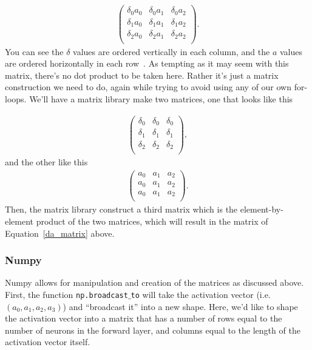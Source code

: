 \documentclass[12pt]{article}
\begin{document}
\begin{align}
 \begin{pmatrix}
           \delta_0 a_0 & \delta_0 a_1  & \delta_0 a_2\\
           \delta_1 a_0 & \delta_1 a_1  & \delta_1 a_2\\
           \delta_2 a_0 & \delta_2 a_1 & \delta_2 a_2\\
         \end{pmatrix}.
         \label{da_matrix}
 \end{align}
You can see the $\delta$ values are ordered vertically in each column, and the $a$ values are ordered horizontally in each row~\cite{karpathy_youtube_01}. As tempting as it may seem with this matrix, there's no dot product to be taken here. Rather it's just a matrix construction we need to do, again while trying to avoid using any of our own for-loops.  We'll have a matrix library make two matrices, one that looks like this
 
 \begin{align}
 \begin{pmatrix}
           \delta_0 & \delta_0 & \delta_0\\
           \delta_1 & \delta_1 & \delta_1\\
           \delta_2 & \delta_2 & \delta_2\\
         \end{pmatrix},
 \end{align}
 and the other like this
 \begin{align}
 \begin{pmatrix}
           a_0 & a_1  & a_2\\
           a_0 & a_1  & a_2\\
           a_0 & a_1 & a_2\\
         \end{pmatrix}.
         \label{act_matrix}
 \end{align}
Then, the matrix library construct a third matrix which is the element-by-element product of the two matrices, which will result in the matrix of Equation~\ref{da_matrix} above.
 
 


\subsubsection*{Numpy}

Numpy allows for manipulation and creation of the matrices as discussed above. First, the function {\tt np.broadcast$\_$to} will take the activation vector (i.e. $(a_0,a_1,a_2,a_3)$) and ``broadcast it'' into a new shape.  Here, we'd like to shape the activation vector into a matrix that has a number of rows equal to the number of neurons in the forward layer, and columns equal to the length of the activation vector itself. 
\end{document}
